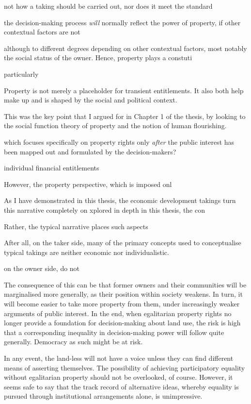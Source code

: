 not how a taking should be carried out, nor does it meet the standard 




 the decision-making process {\it will} normally reflect the power of property, if other contextual factors are not 

although to different degrees depending on other contextual factors, most notably the social status of the owner. Hence, property plays a constuti


particularly 


Property is not merely a placeholder for transient entitlements. It also both help make up and is shaped by the social and political context. 


 This was the key point that I argued for in Chapter 1 of the thesis, by looking to the social function theory of property and the notion of human flourishing. 


which focuses specifically on property rights only {\it after} the public interest has been mapped out and formulated by the decision-makers? 



 individual financial entitlements 

However, the property perspective, which is imposed onl

As I have demonstrated in this thesis, the economic development takings turn this narrative completely on  xplored in depth in this thesis, the con

Rather, the typical narrative places such aspects

After all, on the taker side, many of the primary concepts used to conceptualise typical takings are neither economic nor individualistic.

 on the owner side, do not 

The consequence of this can be that former owners and their communities will be marginalised more generally, as their position within society weakens. In turn, it will become easier to take more property from them, under increasingly weaker arguments of public interest. In the end, when egalitarian property rights no longer provide a foundation for decision-making about land use, the risk is high that a corresponding inequality in decision-making power will follow quite generally. Democracy as such might be at risk.

In any event, the land-less will not have a voice unless they can find different means of asserting themselves. The possibility of achieving participatory equality without egalitarian property should not be overlooked, of course. However, it seems safe to say that the track record of alternative ideas, whereby equality is pursued through institutional arrangements alone, is unimpressive. 

